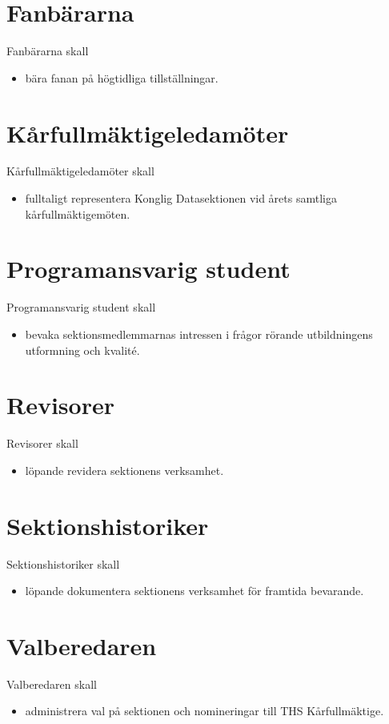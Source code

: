 \documentclass{dgovdoc}
\begin{document}
\section{Fanbärarna}

Fanbärarna skall

\begin{itemize}
\item bära fanan på högtidliga tillställningar.
\end{itemize}

\section{Kårfullmäktigeledamöter}

Kårfullmäktigeledamöter skall

\begin{itemize}
\item fulltaligt representera Konglig Datasektionen vid årets samtliga
    kårfullmäktigemöten.
\end{itemize}

\section{Programansvarig student}

Programansvarig student skall

\begin{itemize}
\item bevaka sektionsmedlemmarnas intressen i frågor rörande utbildningens
    utformning och kvalité.
\end{itemize}

\section{Revisorer}

Revisorer skall

\begin{itemize}
\item löpande revidera sektionens verksamhet.
\end{itemize}

\section{Sektionshistoriker}

Sektionshistoriker skall

\begin{itemize}
\item löpande dokumentera sektionens verksamhet för framtida bevarande.
\end{itemize}

\section{Valberedaren}

Valberedaren skall

\begin{itemize}
\item administrera val på sektionen och nomineringar till THS Kårfullmäktige.
\end{itemize}
\end{document}
